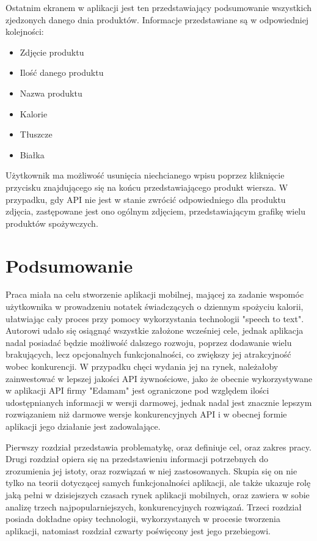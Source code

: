 \documentclass[12pt, a4paper]{article}
\begin{document}
\begin{sloppypar}
{{    Ostatnim ekranem w aplikacji jest ten przedstawiający podsumowanie wszystkich zjedzonych
    danego dnia produktów. Informacje przedstawiane są w odpowiedniej kolejności:
    \begin{itemize}
      \item Zdjęcie produktu
      \item Ilość danego produktu
      \item Nazwa produktu
      \item Kalorie
      \item Tłuszcze
      \item Białka
    \end{itemize}
    Użytkownik ma możliwość usunięcia niechcianego wpisu poprzez kliknięcie przycisku
    znajdującego się na końcu przedstawiającego produkt wiersza. W przypadku, gdy API nie
    jest w stanie zwrócić odpowiedniego dla produktu zdjęcia, zastępowane jest ono ogólnym
    zdjęciem, przedstawiającym grafikę wielu produktów spożywczych.
  }
}

\section{Podsumowanie}
{
  Praca miała na celu stworzenie aplikacji mobilnej, mającej za zadanie wspomóc użytkownika
  w prowadzeniu notatek świadczących o dziennym spożyciu kalorii, ułatwiając cały proces
  przy pomocy wykorzystania technologii "speech to text". Autorowi udało się osiągnąć wszystkie
  założone wcześniej cele, jednak aplikacja nadal posiadać będzie możliwość dalszego rozwoju,
  poprzez dodawanie wielu brakujących, lecz opcjonalnych funkcjonalności,
  co zwiększy jej atrakcyjność wobec konkurencji. W przypadku chęci wydania jej na rynek,
  należałoby zainwestować w lepszej jakości API żywnościowe, jako że obecnie wykorzystywane
  w aplikacji API firmy "Edamam" jest ograniczone pod względem ilości udostępnianych
  informacji w wersji darmowej, jednak nadal jest znacznie lepszym rozwiązaniem niż
  darmowe wersje konkurencyjnych API i w obecnej formie aplikacji jego działanie jest
  zadowalające.

  Pierwszy rozdział przedstawia problematykę, oraz definiuje cel, oraz zakres pracy.
  Drugi rozdział opiera się na przedstawieniu informacji potrzebnych do zrozumienia
  jej istoty, oraz rozwiązań w niej zastosowanych. Skupia się on nie tylko na teorii
  dotyczącej samych funkcjonalności aplikacji, ale także ukazuje rolę jaką pełni w
  dzisiejszych czasach rynek aplikacji mobilnych, oraz zawiera w sobie analizę trzech
  najpopularniejszych, konkurencyjnych rozwiązań. Trzeci rozdział posiada dokładne opisy
  technologii, wykorzystanych w procesie tworzenia aplikacji, natomiast rozdział czwarty
  poświęcony jest jego przebiegowi.

}
\end{sloppypar}
\end{document}
